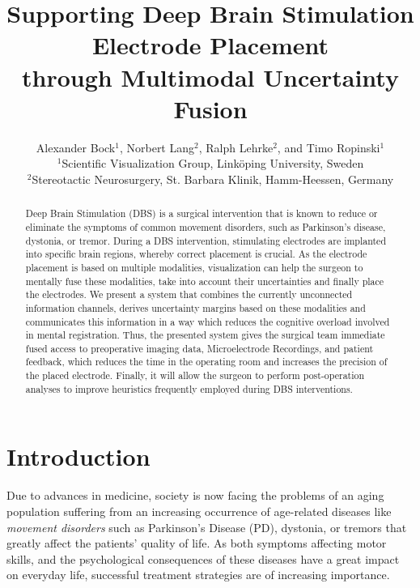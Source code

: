 \documentclass{egpubl}
\title{Supporting Deep Brain Stimulation Electrode Placement\\through Multimodal Uncertainty Fusion}
\author[Bock et al.]{
Alexander Bock$^1$,
Norbert Lang$^2$,
Ralph Lehrke$^2$,
and Timo Ropinski$^1$\\
$^1$Scientific Visualization Group, Link\"oping University, Sweden\\
$^2$Stereotactic Neurosurgery, St. Barbara Klinik, Hamm-Heessen, Germany
}
\begin{document}
\maketitle
\begin{abstract}
Deep Brain Stimulation (DBS) is a surgical intervention that is known to reduce or eliminate the symptoms of common movement disorders, such as Parkinson's disease, dystonia, or tremor. During a DBS intervention, stimulating electrodes are implanted into specific brain regions, whereby correct placement is crucial. As the electrode placement is based on multiple modalities, visualization can help the surgeon to mentally fuse these modalities, take into account their uncertainties and finally place the electrodes. We present a system that combines the currently unconnected information channels, derives uncertainty margins based on these modalities and communicates this information in a way which reduces the cognitive overload involved in mental registration. Thus, the presented system gives the surgical team immediate fused access to preoperative imaging data, Microelectrode Recordings, and patient feedback, which reduces the time in the operating room and increases the precision of the placed electrode. Finally, it will allow the surgeon to perform post-operation analyses to improve heuristics frequently employed during DBS interventions.
\end{abstract}

\section{Introduction}\label{sec:introduction}
Due to advances in medicine, society is now facing the problems of an aging population suffering from an increasing occurrence of age-related diseases like \emph{movement disorders} such as Parkinson's Disease (PD), dystonia, or tremors that greatly affect the patients' quality of life. As both symptoms affecting motor skills, and the psychological consequences of these diseases have a great impact on everyday life, successful treatment strategies are of increasing importance.
\end{document}
